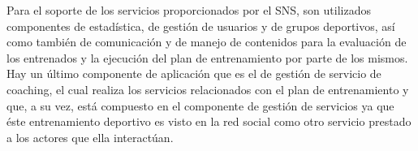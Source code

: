 Para el soporte de los servicios proporcionados por el SNS, son utilizados componentes de estadística, de gestión de usuarios y de grupos deportivos, así como también de comunicación y de manejo de contenidos para la evaluación de los entrenados y la ejecución del plan de entrenamiento por parte de los mismos. Hay un último componente de aplicación que es el de gestión de servicio de coaching, el cual realiza los servicios relacionados con el plan de entrenamiento y que, a su vez, está compuesto en el componente de gestión de servicios ya que éste entrenamiento deportivo es visto en la red social como otro servicio prestado a los actores que ella interactúan.